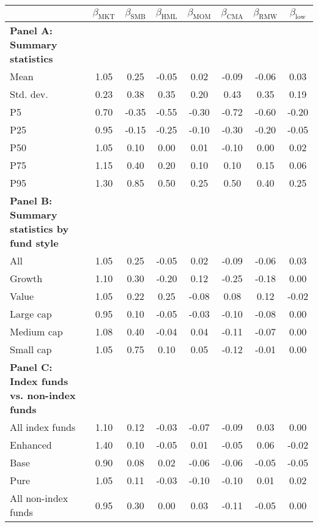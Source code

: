 \begin{tabular}{@{}lccccccc@{}}
\toprule
                   & \( \beta_{\text{MKT}} \) & \( \beta_{\text{SMB}} \) & \( \beta_{\text{HML}} \) & \( \beta_{\text{MOM}} \) & \( \beta_{\text{CMA}} \) & \( \beta_{\text{RMW}} \) & \( \beta_{\text{low}} \) \\ \midrule
\textbf{Panel A: Summary statistics} &      &      &      &      &      &      &      \\
Mean              & 1.05 & 0.25 & -0.05 & 0.02 & -0.09 & -0.06 & 0.03 \\
Std. dev.         & 0.23 & 0.38 & 0.35  & 0.20 & 0.43  & 0.35  & 0.19 \\
P5                & 0.70 & -0.35 & -0.55 & -0.30 & -0.72 & -0.60 & -0.20 \\
P25               & 0.95 & -0.15 & -0.25 & -0.10 & -0.30 & -0.20 & -0.05 \\
P50               & 1.05 & 0.10  & 0.00  & 0.01  & -0.10 & 0.00  & 0.02 \\
P75               & 1.15 & 0.40  & 0.20  & 0.10  & 0.10  & 0.15  & 0.06 \\
P95               & 1.30 & 0.85  & 0.50  & 0.25  & 0.50  & 0.40  & 0.25 \\ \addlinespace
\textbf{Panel B: Summary statistics by fund style} &      &      &      &      &      &      &      \\
All                & 1.05 & 0.25 & -0.05 & 0.02 & -0.09 & -0.06 & 0.03 \\
Growth             & 1.10 & 0.30 & -0.20 & 0.12 & -0.25 & -0.18 & 0.00 \\
Value              & 1.05 & 0.22 & 0.25  & -0.08 & 0.08  & 0.12  & -0.02 \\
Large cap          & 0.95 & 0.10 & -0.05 & -0.03 & -0.10 & -0.08 & 0.00 \\
Medium cap         & 1.08 & 0.40 & -0.04 & 0.04  & -0.11 & -0.07 & 0.00 \\
Small cap          & 1.05 & 0.75 & 0.10  & 0.05  & -0.12 & -0.01 & 0.00 \\ \addlinespace
\textbf{Panel C: Index funds vs. non-index funds} &      &      &      &      &      &      &      \\
All index funds    & 1.10 & 0.12 & -0.03 & -0.07 & -0.09 & 0.03  & 0.00 \\
Enhanced           & 1.40 & 0.10 & -0.05 & 0.01  & -0.05 & 0.06  & -0.02 \\
Base               & 0.90 & 0.08 & 0.02  & -0.06 & -0.06 & -0.05 & -0.05 \\
Pure               & 1.05 & 0.11 & -0.03 & -0.10 & -0.10 & 0.01  & 0.02 \\
All non-index funds& 0.95 & 0.30 & 0.00  & 0.03  & -0.11 & -0.05 & 0.00 \\ \bottomrule
\end{tabular}